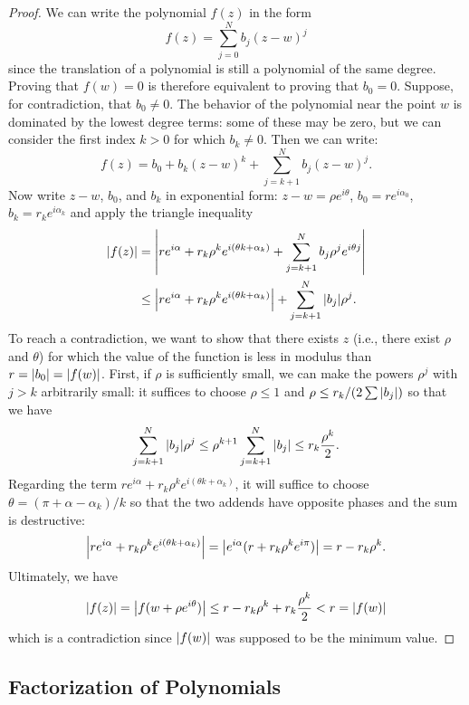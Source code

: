 \begin{proof}
  We can write the polynomial $f(z)$ in the form
  \[
    f(z) = \sum_{j=0}^N b_j (z-w)^j
  \]
    since the translation of a polynomial is still a polynomial of the same
  degree.
  Proving that $f(w)=0$ is therefore equivalent to proving that $b_0=0$.
  Suppose, for contradiction, that $b_0\neq 0$. 
    The behavior of the polynomial near the point $w$ is dominated by the lowest
  degree terms: some of these may be zero, but we can consider the first index
  $k>0$ for which $b_k\neq 0$. Then we can write:
  \[
      f(z) = b_0 + b_k(z-w)^k + \sum_{j=k+1}^N b_j (z-w)^j.
  \]
Now write $z-w$, $b_0$, and $b_k$ in exponential form:
$z - w = \rho e^{i\theta}$, $b_0 = r e^{i \alpha_0}$,
$b_k = r_k e^{i\alpha_k}$ 
and apply the triangle inequality
  \begin{align*}
    {\left|f(z)\right|} 
    &= {\left|r e^{i\alpha} + r_k \rho^k e^{i(\theta k+\alpha_k)} 
    + \sum_{j=k+1}^N b_j \rho^j e^{i\theta j}\right|} \\
    &\le {\left|r e^{i\alpha} + r_k \rho^k e^{i(\theta k + \alpha_k )}\right|} 
    + \sum_{j=k+1}^N {\left|b_j\right|} \rho^j.
  \end{align*}
To reach a contradiction, we want to show that there exists $z$ (i.e., there
exist $\rho$ and $\theta$) for which the value of the function is less in
modulus than $r = {\left|b_0\right|} = {\left|f(w)\right|}$.
First, if $\rho$ is sufficiently small, we can make the powers $\rho^j$ with
$j>k$ arbitrarily small: it suffices to choose $\rho\le 1$ and $\rho \le
r_k/(2\sum {\left|b_j\right|})$ so that we have
\[
  \sum_{j=k+1}^N {\left|b_j\right|} \rho^j
  \le \rho^{k+1} \sum_{j=k+1}^N {\left|b_j\right|} \le r_k\frac{\rho^{k}}{2}.
\]
Regarding the term $r e^{i\alpha} + r_k \rho^k e^{i(\theta k + \alpha_k)}$, it
will suffice to choose $\theta = (\pi + \alpha - \alpha_k) /k$ so that the two
addends have opposite phases and the sum is destructive:
\[
  {\left|r e^{i\alpha} + r_k \rho^k e^{i(\theta k + \alpha_k)}\right|}
  = {\left|e^{i\alpha}(r + r_k \rho^k e^{i\pi})\right|}
  = r - r_k\rho^k.
\]
Ultimately, we have
\[
{\left|f(z)\right|} = {\left|f(w+\rho e^{i\theta})\right|} 
\le r - r_k\rho^k + r_k\frac{\rho^k}{2} 
< r = {\left|f(w)\right|}
\]
which is a contradiction since ${\left|f(w)\right|}$ was supposed to be the minimum
value.
\end{proof}
  
\subsection{Factorization of Polynomials}

